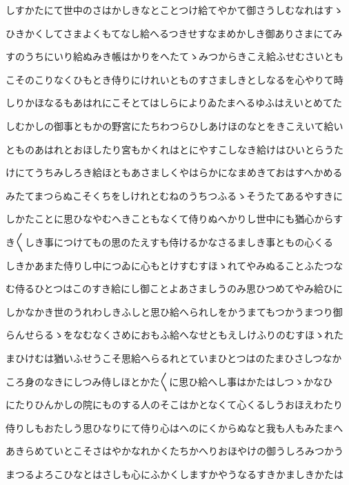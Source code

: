 \documentclass[a4paper,11pt,landscape]{ltjtarticle}
\begin{document}
しすかたにて世中のさはかしきなとことつけ給てやかて御さうしむなれはすゝ
\par\medskip
ひきかくしてさまよくもてなし給へるつきせすなまめかしき御ありさまにてみ
\par\medskip
すのうちにいり給ぬみき帳はかりをへたてゝみつからきこえ給ふせむさいとも
\par\medskip
こそのこりなくひもとき侍りにけれいとものすさましきとしなるを心やりて時
\par\medskip
しりかほなるもあはれにこそとてはしらによりゐたまへるゆふはえいとめてた
\par\medskip
しむかしの御事ともかの野宮にたちわつらひしあけほのなとをきこえいて給い
\par\medskip
とものあはれとおほしたり宮もかくれはとにやすこしなき給けはひいとらうた
\par\medskip
けにてうちみしろき給ほともあさましくやはらかになまめきておはすへかめる
\par\medskip
みたてまつらぬこそくちをしけれとむねのうちつふるゝそうたてあるやすきに
\par\medskip
しかたことに思ひなやむへきこともなくて侍りぬへかりし世中にも猶心からす
\par\medskip
き〱しき事につけてもの思のたえすも侍けるかなさるましき事ともの心くる
\par\medskip
しきかあまた侍りし中につゐに心もとけすむすほゝれてやみぬることふたつな
\par\medskip
む侍るひとつはこのすき給にし御ことよあさましうのみ思ひつめてやみ給ひに
\par\medskip
しかなかき世のうれわしきふしと思ひ給へられしをかうまてもつかうまつり御
\par\medskip
らんせらるゝをなむなくさめにおもふ給へなせともえしけふりのむすほゝれた
\par\medskip
まひけむは猶いふせうこそ思給へらるれとていまひとつはのたまひさしつなか
\par\medskip
ころ身のなきにしつみ侍しほとかた〱に思ひ給へし事はかたはしつゝかなひ
\par\medskip
にたりひんかしの院にものする人のそこはかとなくて心くるしうおほえわたり
\par\medskip
侍りしもおたしう思ひなりにて侍り心はへのにくからぬなと我も人もみたまへ
\par\medskip
あきらめていとこそさはやかなれかくたちかへりおほやけの御うしろみつかう
\par\medskip
まつるよろこひなとはさしも心にふかくしますかやうなるすきかましきかたは
\par\medskip
\end{document}
